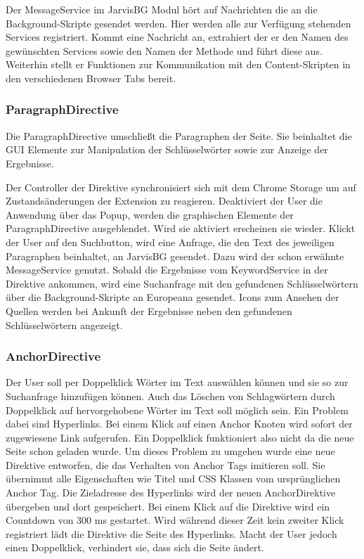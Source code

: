   Der MessageService im JarvisBG Modul hört auf Nachrichten die an die Background-Skripte gesendet werden. Hier werden alle zur Verfügung stehenden Services registriert. Kommt eine Nachricht an, extrahiert der er den Namen des gewünschten Services sowie den Namen der Methode und führt diese aus. Weiterhin stellt er Funktionen zur Kommunikation mit den Content-Skripten in den verschiedenen Browser Tabs bereit.

  \subsubsection{ParagraphDirective}
  Die ParagraphDirective umschließt die Paragraphen der Seite. Sie beinhaltet die GUI Elemente zur Manipulation der Schlüsselwörter sowie zur Anzeige der Ergebnisse. 

  Der Controller der Direktive synchronisiert sich mit dem Chrome Storage um auf Zustandsänderungen der Extension zu reagieren. Deaktiviert der User die Anwendung über das Popup, werden die graphischen Elemente der ParagraphDirective ausgeblendet. Wird sie aktiviert erscheinen sie wieder. Klickt der User auf den Suchbutton, wird eine Anfrage, die den Text des jeweiligen Paragraphen beinhaltet, an JarvisBG gesendet. Dazu wird der schon erwähnte MessageService genutzt. Sobald die Ergebnisse vom KeywordService in der Direktive ankommen, wird eine Suchanfrage mit den gefundenen Schlüsselwörtern über die Background-Skripte an Europeana gesendet. Icons zum Ansehen der Quellen werden bei Ankunft der Ergebnisse neben den gefundenen Schlüsselwörtern angezeigt.

  \subsubsection{AnchorDirective}
  Der User soll per Doppelklick Wörter im Text auswählen können und sie so zur Suchanfrage hinzufügen können. Auch das Löschen von Schlagwörtern durch Doppelklick auf hervorgehobene Wörter im Text soll möglich sein. Ein Problem dabei sind Hyperlinks. Bei einem Klick auf einen Anchor Knoten wird sofort der zugewiesene Link aufgerufen. Ein Doppelklick funktioniert also nicht da die neue Seite schon geladen wurde. Um dieses Problem zu umgehen wurde eine neue Direktive entworfen, die das Verhalten von Anchor Tags imitieren soll. Sie übernimmt alle Eigenschaften wie Titel und CSS Klassen vom ursprünglichen Anchor Tag. Die Zieladresse des Hyperlinks wird der neuen AnchorDirektive übergeben und dort gespeichert. Bei einem Klick auf die Direktive wird ein Countdown von 300 ms gestartet. Wird während dieser Zeit kein zweiter Klick registriert lädt die Direktive die Seite des Hyperlinks. Macht der User jedoch einen Doppelklick, verhindert sie, dass sich die Seite ändert.

